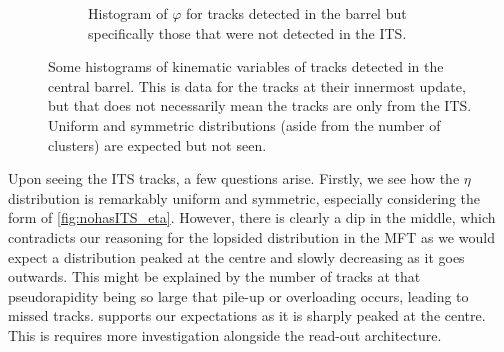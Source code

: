 \begin{figure}[h]
\begin{subfigure}[t]{.49\linewidth}
        \caption{Histogram of $\varphi$ for tracks detected in the barrel but specifically those that were not detected in the ITS.}
        \label{fig:nohasITS_phi_no_ITS}
    \end{subfigure}
\caption[Histograms of $\eta$, $\varphi$, and ITS inner barrel  for tracks in the central barrel]{Some histograms of kinematic variables of tracks detected in the central barrel. This is data for the tracks at their innermost update, but that does not necessarily mean the tracks are only from the ITS. Uniform and symmetric distributions (aside from the number of clusters) are expected but not seen.}
\label{fig:ITS_1D_nohasITS}
\end{figure}

Upon seeing the ITS tracks, a few questions arise. Firstly, we see how the $\eta$ distribution is remarkably uniform and symmetric, especially considering the form of \cref{fig:nohasITS_eta}. However, there is clearly a dip in the middle, which contradicts our reasoning for the lopsided distribution in the MFT as we would expect a distribution peaked at the centre and slowly decreasing as it goes outwards. This might be explained by the number of tracks at that pseudorapidity being so large that pile-up or overloading occurs, leading to missed tracks.  supports our expectations as it is sharply peaked at the centre. This is requires more investigation alongside the read-out architecture.

